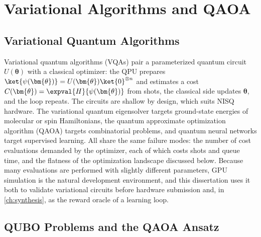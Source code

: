 \section{Variational Algorithms and QAOA}\label{sec:bg:vqa}

\subsection{Variational Quantum Algorithms}

Variational quantum algorithms (VQAs) \cite{cerezo2021vqa} pair a parameterized quantum circuit $U(\bm{\theta})$ with a classical optimizer: the QPU prepares $\ket{\psi(\bm{\theta})}=U(\bm{\theta})\ket{0}^{\otimes n}$ and estimates a cost $C(\bm{\theta})=\expval{H}{\psi(\bm{\theta})}$ from shots, the classical side updates $\bm{\theta}$, and the loop repeats. The circuits are shallow by design, which suits NISQ hardware. The variational quantum eigensolver targets ground-state energies of molecular or spin Hamiltonians, the quantum approximate optimization algorithm (QAOA) targets combinatorial problems, and quantum neural networks target supervised learning. All share the same failure modes: the number of cost evaluations demanded by the optimizer, each of which costs shots and queue time, and the flatness of the optimization landscape discussed below. Because many evaluations are performed with slightly different parameters, GPU simulation is the natural development environment, and this dissertation uses it both to validate variational circuits before hardware submission and, in \cref{ch:synthesis}, as the reward oracle of a learning loop.

\subsection{QUBO Problems and the QAOA Ansatz}


